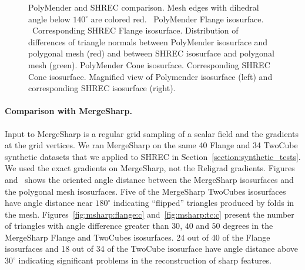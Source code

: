 \begin{figure}[t]
\caption{PolyMender and SHREC comparison.
Mesh edges with dihedral angle below $140^\circ$ are colored red.
\protect{}~PolyMender Flange isosurface.
\protect{}~Corresponding SHREC Flange isosurface.
\protect{} Distribution of differences of triangle normals
between PolyMender isosurface and polygonal mesh (red)
and between SHREC isosurface and polygonal mesh (green).
\protect{} PolyMender Cone isosurface.
\protect{} Corresponding SHREC Cone isosurface.
\protect{} Magnified view of Polymender isosurface (left)
and corresponding SHREC isosurface (right).
} 
\label{fig:polymenderB}
\end{figure}


\paragraph{Comparison with MergeSharp.}


Input to MergeSharp is a regular grid sampling of a scalar field
and the gradients at the grid vertices.
We ran MergeSharp on the same 40 Flange and 34 TwoCube synthetic datasets
that we applied to SHREC in Section~\ref{section:synthetic_tests}.
We used the exact gradients on MergeSharp, not the Religrad gradients.
Figures~ and~
shows the oriented angle distance between the MergeSharp isosurfaces 
and the polygonal mesh isosurfaces.
Five of the MergeSharp TwoCubes isosurfaces have angle distance 
near $180^\circ$ indicating ``flipped'' triangles produced by folds
in the mesh.
Figures~\ref{fig:msharp:flange:c} and~\ref{fig:msharp:tc:c} 
present the number of triangles with angle difference greater
than $30$, $40$ and $50$ degrees 
in the MergeSharp Flange and TwoCubes isosurfaces.
24 out of 40 of the Flange isosurfaces and 18 out of 34 
of the TwoCube isosurface have angle distance above $30^\circ$
indicating significant problems in the reconstruction of sharp features.

